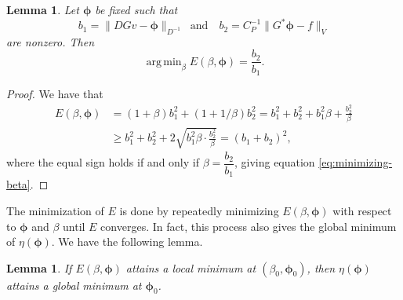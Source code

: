 \documentclass[ ]{elsarticle}
\DeclareMathOperator*{\argmin}{arg\,min}
\newcommand{\Grad}{G}
\newcommand{\Div}{G^*}
\newcommand{\vsp}{V}
\newtheorem{lemma}[theorem]{Lemma}
\numberwithin{equation}{section}
\begin{document}
\begin{lemma}\label{lemma:minimizing-beta}
  Let $\bm\phi$ be fixed such that
  \begin{equation*}
    b_1=\|D\Grad v-\bm\phi\|_{D^{-1}} \;\;\text{and} \quad
    b_2 = C_P^{-1}\|\Div\bm\phi-f\|_\vsp
  \end{equation*}
  are nonzero. Then
  \begin{equation}\label{eq:minimizing-beta}
    \argmin_{\beta}E(\beta,\bm\phi) = \frac{b_2}{b_1}.
  \end{equation}
\end{lemma}

\begin{proof}
  We have that
  \begin{align*}
    E(\beta,\bm\phi) & = (1+\beta)b_1^2+(1+1/\beta)b_2^2 = b_1^2+b_2^2+b_1^2\beta+\frac{b_2^2}{\beta} \\
                     & \geq b_1^2+b_2^2+2\sqrt{b_1^2\beta\cdot\frac{b_2^2}{\beta}} = (b_1+b_2)^2,
  \end{align*}
  where the equal sign holds if and only if
  $\beta = \dfrac{b_2}{b_1}$, giving equation
  \eqref{eq:minimizing-beta}.
\end{proof}

The minimization of $E$ is done by repeatedly minimizing
$E(\beta,\bm\phi)$ with respect to $\bm\phi$ and $\beta$ until $E$
converges. In fact, this process also gives the global minimum of
$\eta(\bm\phi)$. We have the following lemma.

\begin{lemma}
  If $E(\beta,\bm\phi)$ attains a local minimum at
  $(\beta_0,\bm\phi_0)$, then $\eta(\bm\phi)$ attains a global minimum
  at $\bm\phi_0$.
\end{lemma}
\end{document}
